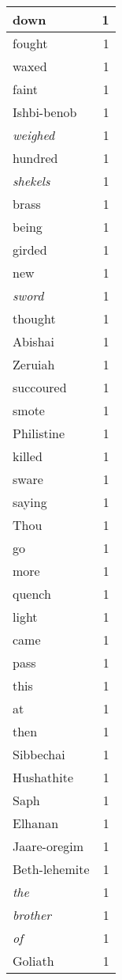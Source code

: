 \begin{center}
\begin{longtable}{l|r}
down & 1 \\ \hline
fought & 1 \\ \hline
waxed & 1 \\ \hline
faint & 1 \\ \hline
Ishbi-benob & 1 \\ \hline
\emph{weighed} & 1 \\ \hline
hundred & 1 \\ \hline
\emph{shekels} & 1 \\ \hline
brass & 1 \\ \hline
being & 1 \\ \hline
girded & 1 \\ \hline
new & 1 \\ \hline
\emph{sword} & 1 \\ \hline
thought & 1 \\ \hline
Abishai & 1 \\ \hline
Zeruiah & 1 \\ \hline
succoured & 1 \\ \hline
smote & 1 \\ \hline
Philistine & 1 \\ \hline
killed & 1 \\ \hline
sware & 1 \\ \hline
saying & 1 \\ \hline
Thou & 1 \\ \hline
go & 1 \\ \hline
more & 1 \\ \hline
quench & 1 \\ \hline
light & 1 \\ \hline
came & 1 \\ \hline
pass & 1 \\ \hline
this & 1 \\ \hline
at & 1 \\ \hline
then & 1 \\ \hline
Sibbechai & 1 \\ \hline
Hushathite & 1 \\ \hline
Saph & 1 \\ \hline
Elhanan & 1 \\ \hline
Jaare-oregim & 1 \\ \hline
Beth-lehemite & 1 \\ \hline
\emph{the} & 1 \\ \hline
\emph{brother} & 1 \\ \hline
\emph{of} & 1 \\ \hline
Goliath & 1 \\ \hline

\end{longtable}
\end{center}
